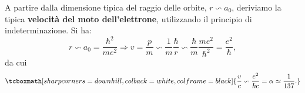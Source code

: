 A partire dalla dimensione tipica del raggio delle orbite, $r \backsim a_0$, deriviamo la tipica \textbf{velocità del moto dell'elettrone}, utilizzando il principio di indeterminazione. Si ha:
	\begin{equation}
		r   \backsim   a_0 =\frac{\hbar ^2}{me^2}  \Rightarrow   v=\frac{p}{m} \backsim \frac{1}{m} \frac{\hbar}{r}\backsim \frac{\hbar}{m}\frac{me^2}{\hbar ^2}=\frac{e^2}{\hbar}, 
	\end{equation}
da cui
	\begin{equation}
		\tcboxmath[sharp corners=downhill, colback=white, colframe=black]{
			\frac{v}{c}\backsim \frac{e^2}{\hbar c}=\alpha \simeq \frac{1}{137}.
			}
	\end{equation}
